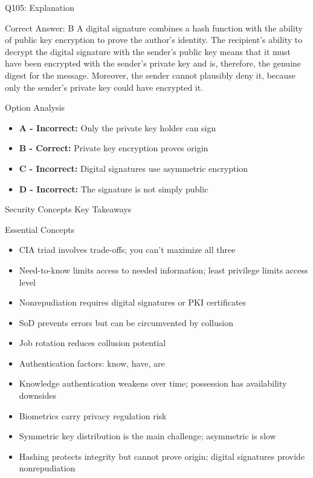 \documentclass{beamer}
\begin{document}
	\begin{frame}{Q105: Explanation}
		\begin{block}{Correct Answer: B}
			A digital signature combines a hash function with the ability of public key encryption to prove the author's identity. The recipient's ability to decrypt the digital signature with the sender's public key means that it must have been encrypted with the sender's private key and is, therefore, the genuine digest for the message. Moreover, the sender cannot plausibly deny it, because only the sender's private key could have encrypted it.
		\end{block}
		\begin{block}{Option Analysis}
			\begin{itemize}
				\item \textbf{A - Incorrect:} Only the private key holder can sign
				\item \textbf{B - Correct:} Private key encryption proves origin
				\item \textbf{C - Incorrect:} Digital signatures use asymmetric encryption
				\item \textbf{D - Incorrect:} The signature is not simply public
			\end{itemize}
		\end{block}
	\end{frame}
	
	
	\begin{frame}{Security Concepts Key Takeaways}
		\begin{block}{Essential Concepts}
			\begin{itemize}
				\item CIA triad involves trade-offs; you can't maximize all three
				\item Need-to-know limits access to needed information; least privilege limits access level
				\item Nonrepudiation requires digital signatures or PKI certificates
				\item SoD prevents errors but can be circumvented by collusion
				\item Job rotation reduces collusion potential
				\item Authentication factors: know, have, are
				\item Knowledge authentication weakens over time; possession has availability downsides
				\item Biometrics carry privacy regulation risk
				\item Symmetric key distribution is the main challenge; asymmetric is slow
				\item Hashing protects integrity but cannot prove origin; digital signatures provide nonrepudiation
			\end{itemize}
		\end{block}
	\end{frame}
	
\end{document}
